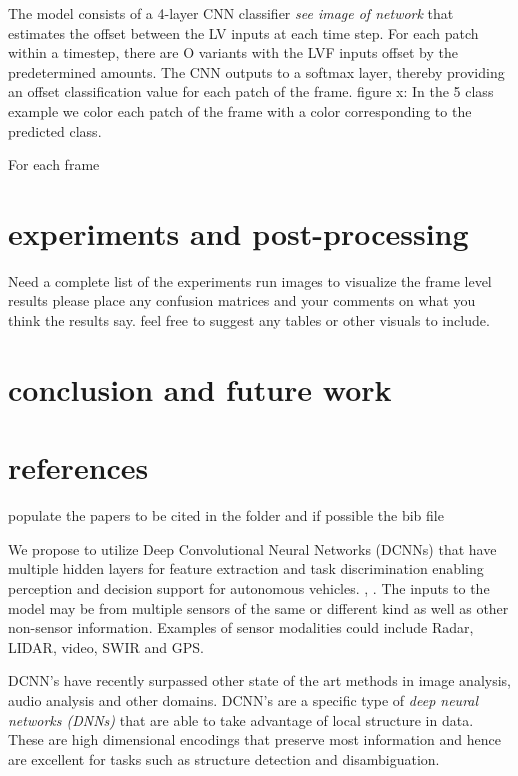\documentclass{article}
\begin{document}
The model consists of a 4-layer  CNN classifier \textit{see image of network} that estimates the offset between the LV inputs at each time step. For each patch within a timestep, there are O variants with the LVF inputs offset by the predetermined amounts. The CNN outputs to a softmax layer, thereby providing an offset classification value for each patch of the frame. 
figure x: In the 5 class example we color each patch of the frame with a color corresponding to the predicted class. 

For each frame 

\section{experiments and post-processing}
Need a complete list of the experiments run
images to visualize the frame level results
please place any confusion matrices and your comments on what you think the results say.
feel free to suggest any tables or other visuals to include.

\section{conclusion and future work}

\section{references}
populate the papers to be cited in the folder and if possible the bib file



We propose to utilize Deep Convolutional Neural Networks (DCNNs) that have multiple
hidden layers for feature extraction and task discrimination enabling perception and decision support for autonomous vehicles. \cite{Verma2013} , \cite{Tran2013}. The inputs to the model may be from multiple sensors of the same or different kind as well as other non-sensor information. Examples of sensor modalities could include Radar, LIDAR, video, SWIR and GPS.

DCNN's  have recently surpassed other state of the art methods in image analysis, audio analysis and other domains. DCNN's are a specific type of \emph{deep neural networks (DNNs)} \cite{HintonSPS2012}\cite{HintonDNN} that are able to take advantage of local structure in data. These are high dimensional encodings that preserve most information and hence are excellent for tasks such as structure detection and disambiguation.  
\end{document}
